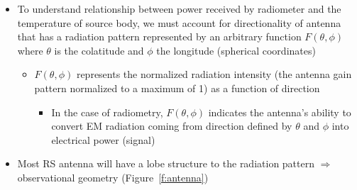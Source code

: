 \documentclass[11pt, oneside]{article}
\begin{document}
\begin{itemize}
	\item To understand relationship between power received by radiometer and the temperature of source body, we must account for directionality of antenna that has a radiation pattern represented by an arbitrary function $F(\theta,\phi)$ where $\theta$ is the colatitude and $\phi$ the longitude (spherical coordinates)
	\begin{itemize}
		\item[] $F(\theta,\phi)$ represents the normalized radiation intensity (the antenna gain pattern normalized to a maximum of 1) as a function of direction
		\begin{itemize}
			\item[$\rightarrow$] In the case of radiometry, $F(\theta,\phi)$ indicates the antenna's ability to convert EM radiation coming from direction defined by $\theta$ and $\phi$ into electrical power (signal)
		\end{itemize}
	\end{itemize}
	\item Most RS antenna will have a lobe structure to the radiation pattern $\Rightarrow$ observational geometry (Figure~\ref{f:antenna})
\end{itemize}
\end{document}
